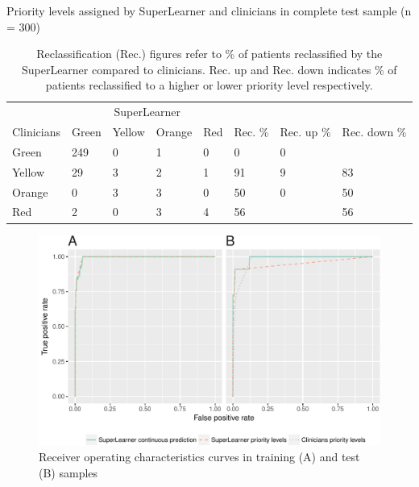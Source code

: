 \documentclass[10pt,letterpaper]{article}\usepackage[]{graphicx}\usepackage[]{color}
\begin{document}
\begin{table}[ht]
\centering
\caption{Priority levels assigned by SuperLearner and clinicians in complete test sample (n = 300)} 
\label{tab:reclass_all}
\begin{tabular}{llllllll}
  \hline
  & \multicolumn{4}{c}{SuperLearner} \\
 Clinicians & Green & Yellow & Orange & Red & Rec. \% & Rec. up \% & Rec. down \% \\
 \hline
Green & 249 & 0 & 1 & 0 & 0 & 0 &  \\ 
  Yellow & 29 & 3 & 2 & 1 & 91 & 9 & 83 \\ 
  Orange & 0 & 3 & 3 & 0 & 50 & 0 & 50 \\ 
  Red & 2 & 0 & 3 & 4 & 56 &  & 56 \\ 
   \hline
\end{tabular}
\caption*{Reclassification (Rec.) figures refer to \% of patients reclassified by the SuperLearner compared to clinicians. Rec. up and Rec. down indicates \% of patients reclassified to a higher or lower priority level respectively.} 
\end{table}


\begin{figure}
  \caption{Receiver operating characteristics curves in training (A) and test
    (B) samples}
  \label{fig:roc_plot}
  \includegraphics[width=\textwidth]{roc_plot.pdf}
\end{figure}
\end{document}
